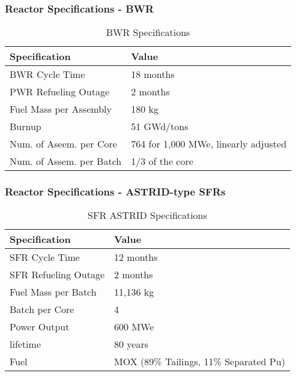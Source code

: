 \begin{frame}
	\frametitle{Reactor Specifications - BWR}
	\begin{table}[h]
	\centering
	\begin{tabularx}{\textwidth}{bb}
		\hline
		Specification & Value \\
		\hline
		BWR Cycle Time & 18 months \\ 
		PWR Refueling Outage & 2 months \\
		Fuel Mass per Assembly & 180 kg \\
		Burnup & 51 GWd/tons \\
		Num. of Aseem. per Core & 764 for 1,000 MWe, linearly adjusted\\
		Num. of Assem. per Batch & 1/3 of the core \\
		\hline
	\end{tabularx}
	\caption {\gls{BWR} Specifications}
	\label{tab:bwr}
\end{table}
\end{frame}

\begin{frame}
	\frametitle{Reactor Specifications - ASTRID-type SFRs}
	
\begin{table}[h]
	\centering
	\begin{tabularx}{\textwidth}{bb}
		\hline
		Specification & Value \\
		\hline
		SFR Cycle Time & 12 months \\ 
		SFR Refueling Outage & 2 months \\
		Fuel Mass per Batch & 11,136 kg \\
		Batch per Core & 4 \\
		Power Output & 600 MWe \\
		lifetime & 80 years \\
		Fuel & {\small \gls{MOX} (89\% Tailings, 11\% Separated Pu)}\\
		\hline
	\end{tabularx}
	\caption {\gls{SFR} ASTRID Specifications \cite{marsaultmarie-sophie_pre-conceptual_2012}}
	\label{tab:sfr}
\end{table}
\end{frame}

	
	
	
	
		